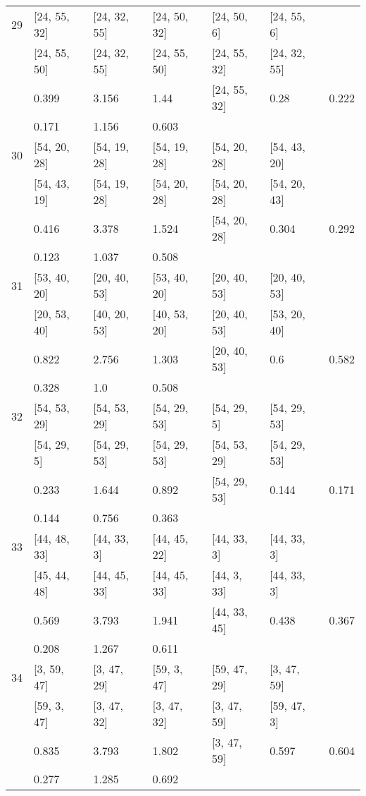 \begin{longtable}{| l || l | l | l | l | l | l | }
\hline
29  & [24, 55, 32] & [24, 32, 55] & [24, 50, 32] & [24, 50, 6] & [24, 55, 6] \\
 & [24, 55, 50] & [24, 32, 55] & [24, 55, 50] & [24, 55, 32] & [24, 32, 55]\\
\hline
& 0.399 & 3.156 & 1.44 & [24, 55, 32] & 0.28 & 0.222\\
\hline
& 0.171 & 1.156 & 0.603 \\
\hline

\hline
30  & [54, 20, 28] & [54, 19, 28] & [54, 19, 28] & [54, 20, 28] & [54, 43, 20] \\
 & [54, 43, 19] & [54, 19, 28] & [54, 20, 28] & [54, 20, 28] & [54, 20, 43]\\
\hline
& 0.416 & 3.378 & 1.524 & [54, 20, 28] & 0.304 & 0.292\\
\hline
& 0.123 & 1.037 & 0.508 \\
\hline

\hline
31  & [53, 40, 20] & [20, 40, 53] & [53, 40, 20] & [20, 40, 53] & [20, 40, 53] \\
 & [20, 53, 40] & [40, 20, 53] & [40, 53, 20] & [20, 40, 53] & [53, 20, 40]\\
\hline
& 0.822 & 2.756 & 1.303 & [20, 40, 53] & 0.6 & 0.582\\
\hline
& 0.328 & 1.0 & 0.508 \\
\hline

\hline
32  & [54, 53, 29] & [54, 53, 29] & [54, 29, 53] & [54, 29, 5] & [54, 29, 53] \\
 & [54, 29, 5] & [54, 29, 53] & [54, 29, 53] & [54, 53, 29] & [54, 29, 53]\\
\hline
& 0.233 & 1.644 & 0.892 & [54, 29, 53] & 0.144 & 0.171\\
\hline
& 0.144 & 0.756 & 0.363 \\
\hline

\hline
33  & [44, 48, 33] & [44, 33, 3] & [44, 45, 22] & [44, 33, 3] & [44, 33, 3] \\
 & [45, 44, 48] & [44, 45, 33] & [44, 45, 33] & [44, 3, 33] & [44, 33, 3]\\
\hline
& 0.569 & 3.793 & 1.941 & [44, 33, 45] & 0.438 & 0.367\\
\hline
& 0.208 & 1.267 & 0.611 \\
\hline

\hline
34  & [3, 59, 47] & [3, 47, 29] & [59, 3, 47] & [59, 47, 29] & [3, 47, 59] \\
 & [59, 3, 47] & [3, 47, 32] & [3, 47, 32] & [3, 47, 59] & [59, 47, 3]\\
\hline
& 0.835 & 3.793 & 1.802 & [3, 47, 59] & 0.597 & 0.604\\
\hline
& 0.277 & 1.285 & 0.692 \\
\hline


\end{longtable}
